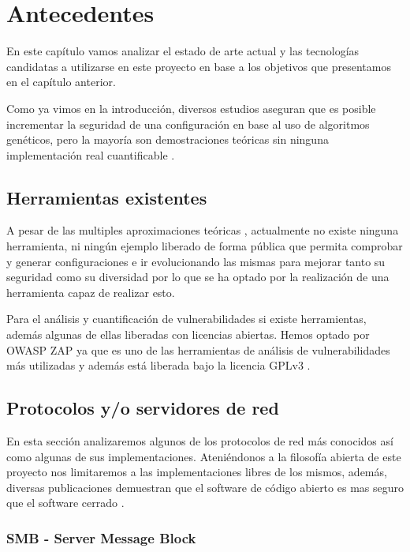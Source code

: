 \chapter{Antecedentes}

En este capítulo vamos analizar el estado de arte actual y las tecnologías candidatas a utilizarse en este proyecto en base a los objetivos que presentamos en el capítulo anterior.

\bigskip
Como ya vimos en la introducción, diversos estudios aseguran que es posible incrementar la seguridad de una configuración en base al uso de algoritmos genéticos, pero la mayoría son demostraciones teóricas sin ninguna implementación real cuantificable  \cite{john_evolutionary_2014} \cite{romero_sistema_2017} \cite{buji_genetic_2017}. 

\section{Herramientas existentes}
A pesar de las multiples aproximaciones teóricas \cite{schlenker_deceiving_2018} \cite{champagne_genetic_2018}, actualmente no existe ninguna herramienta, ni ningún ejemplo liberado de forma pública que permita comprobar y generar configuraciones e ir evolucionando las mismas para mejorar tanto su seguridad como su diversidad por lo que se ha optado por la realización de una herramienta capaz de realizar esto.

\bigskip
Para el análisis y cuantificación de vulnerabilidades si existe herramientas, además algunas de ellas liberadas con licencias abiertas. Hemos optado por OWASP ZAP ya que es uno de las herramientas de análisis de vulnerabilidades más utilizadas y además está liberada bajo la licencia GPLv3 \cite{free_software_foundation_gnu_2007}.

\section {Protocolos y/o servidores de red}

En esta sección analizaremos algunos de los protocolos de red más conocidos así como algunas de sus implementaciones. Ateniéndonos a la filosofía abierta de este proyecto nos limitaremos a las implementaciones libres de los mismos, además, diversas publicaciones demuestran que el software de código abierto es mas seguro que el software cerrado \cite{walia_comparative_2006} \cite{mansfield-devine_open_2008} \cite{clark_is_2009}.

\subsection {SMB - Server Message Block}

